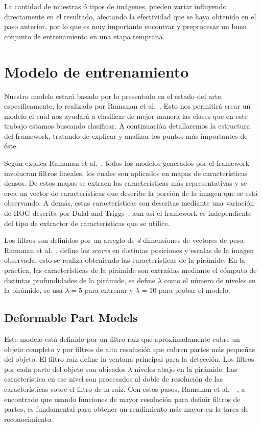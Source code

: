La cantidad de muestras ó tipos de imágenes, pueden variar influyendo directamente en el resultado, afectando la efectividad que se haya obtenido en el paso anterior, por lo que es muy importante encontrar y preprocesar un buen conjunto de entrenamiento en una etapa temprana.

\section{Modelo de entrenamiento}
\label{sec:model}
Nuestro modelo estará basado por lo presentado en el estado del arte, específicamente, lo realizado por Ramanan et al.~\cite{Felzenszwalb2010}. Esto nos permitirá crear un modelo el cual nos ayudará a clasificar de mejor manera las clases que en este trabajo estamos buscando clasificar. A continuación detallaremos la estructura del framework, tratando de explicar y analizar los puntos más importantes de éste.

Según explica Ramanan et al.~\cite{Felzenszwalb2010}, todos los modelos generados por el framework involucran filtros lineales, los cuales son aplicados en mapas de características densos. De estos mapas se extraen las características más representativas y se crea un vector de características que describe la porción de la imagen que se está observando. A demás, estas características son descritas mediante una variación de HOG descrita por Dalal and Triggs~\cite{Dalal2005}, aun así el framework es independiente del tipo de extractor de características que se utilice.

Los filtros son definidos por un arreglo de \textit{d} dimensiones de vectores de peso. Ramanan et al.~\cite{Felzenszwalb2010}, define los \textit{scores} en distintas posiciones y escalas de la imagen observada, esto se realiza obteniendo las características de la pirámide. En la práctica, las características de la pirámide son extraídas mediante el cómputo de distintas profundidades de la pirámide, se define $\lambda$ como el número de niveles en la pirámide, se usa $\lambda = 5$ para entrenar y $\lambda = 10$ para probar el modelo.

\subsection{Deformable Part Models}
\label{subsec:dpm}
Este modelo está definido por un filtro raíz que aproximadamente cubre un objeto completo y por filtros de alta resolución que cubren partes más pequeñas del objeto. El filtro raíz define la ventana principal para la detección. Los filtros por cada parte del objeto son ubicados $\lambda$ niveles abajo en la pirámide. Las característica en ese nivel son procesados al doble de resolución de las características sobre el filtro de la raíz.
Con estos pasos, Ramanan et al.~\cite{Felzenszwalb2010}~\cite{Felzenszwalb2013}, a encontrado que usando funciones de mayor resolución para definir filtros de partes, es fundamental para obtener un rendimiento más mayor en la tarea de reconocimiento.

